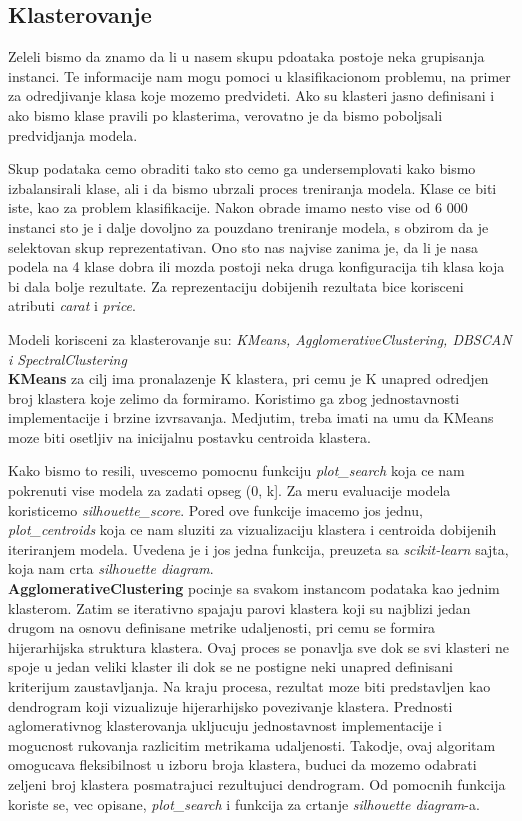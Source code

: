 \documentclass[10pt]{article}
\begin{document}
\subsection{Klasterovanje}
Zeleli bismo da znamo da li u nasem skupu pdoataka postoje neka grupisanja instanci. Te informacije nam mogu pomoci u klasifikacionom problemu, na primer za odredjivanje klasa koje mozemo predvideti. Ako su klasteri jasno definisani i ako bismo klase pravili po klasterima, verovatno je da bismo poboljsali predvidjanja modela.

Skup podataka cemo obraditi tako sto cemo ga undersemplovati kako bismo izbalansirali klase, ali i da bismo ubrzali proces treniranja modela. Klase ce biti iste, kao za problem klasifikacije. Nakon obrade imamo nesto vise od 6 000 instanci sto je i dalje dovoljno za pouzdano treniranje modela, s obzirom da je selektovan skup reprezentativan. Ono sto nas najvise zanima je, da li je nasa podela na 4 klase dobra ili mozda postoji neka druga konfiguracija tih klasa koja bi dala bolje rezultate. Za reprezentaciju dobijenih rezultata bice korisceni atributi \textit{carat} i \textit{price}.

Modeli korisceni za klasterovanje su: \textit{KMeans, AgglomerativeClustering, DBSCAN i SpectralClustering}\\

\textbf{KMeans} za cilj ima pronalazenje K klastera, pri cemu je K unapred odredjen broj klastera koje zelimo da formiramo. Koristimo ga zbog jednostavnosti implementacije i brzine izvrsavanja. Medjutim, treba imati na umu da KMeans moze biti osetljiv na inicijalnu postavku centroida klastera. 

Kako bismo to resili, uvescemo pomocnu funkciju \textit{plot\_search} koja ce nam pokrenuti vise modela za zadati opseg (0, k]. Za meru evaluacije modela koristicemo \textit{silhouette\_score}. Pored ove funkcije imacemo jos jednu, \textit{plot\_centroids} koja ce nam sluziti za vizualizaciju klastera i centroida dobijenih iteriranjem modela. Uvedena je i jos jedna funkcija, preuzeta sa \textit{scikit-learn} sajta, koja nam crta \textit{silhouette diagram}.\\ 

\textbf{AgglomerativeClustering} pocinje sa svakom instancom podataka kao jednim klasterom. Zatim se iterativno spajaju parovi klastera koji su najblizi jedan drugom na osnovu definisane metrike udaljenosti, pri cemu se formira hijerarhijska struktura klastera. Ovaj proces se ponavlja sve dok se svi klasteri ne spoje u jedan veliki klaster ili dok se ne postigne neki unapred definisani kriterijum zaustavljanja. Na kraju procesa, rezultat moze biti predstavljen kao dendrogram koji vizualizuje hijerarhijsko povezivanje klastera. Prednosti aglomerativnog klasterovanja ukljucuju jednostavnost implementacije i mogucnost rukovanja razlicitim metrikama udaljenosti. Takodje, ovaj algoritam omogucava fleksibilnost u izboru broja klastera, buduci da mozemo odabrati zeljeni broj klastera posmatrajuci rezultujuci dendrogram. Od pomocnih funkcija koriste se, vec opisane, \textit{plot\_search} i funkcija za crtanje \textit{silhouette diagram}-a.\\
\end{document}
